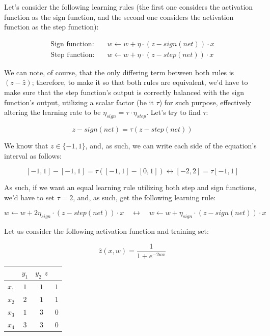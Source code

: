 \documentclass[12pt]{article}
\begin{document}
\begin{enumerate}[leftmargin=\labelsep]
\begin{enumerate}
{      Let's consider the following learning rules (the first one considers
      the activation function as the sign function, and the second one
      considers the activation function as the step function):

      \begin{align*}
        \text{Sign function:} \quad & w \leftarrow w + \eta \cdot (z - sign(net)) \cdot x \\
        \text{Step function:} \quad & w \leftarrow w + \eta \cdot (z - step(net)) \cdot x
      \end{align*}

      We can note, of course, that the only differing term between both rules
      is $(z - \hat{z})$; therefore, to make it so that both rules are
      equivalent, we'd have to make sure that the step function's output
      is correctly balanced with the sign function's output, utilizing a scalar
      factor (be it $\tau$) for such purpose, effectively altering the learning
      rate to be $\eta_{sign} = \tau \cdot \eta_{step}$. Let's try to find $\tau$:

      $$
      z - sign(net) = \tau (z - step(net))
      $$

      We know that $z \in \{-1, 1\}$, and, as such, we can write each side of
      the equation's interval as follows:

      $$
      [-1, 1] - [-1, 1] = \tau ([-1, 1] - [0, 1]) \leftrightarrow
      [-2, 2] = \tau [-1, 1]
      $$

      As such, if we want an equal learning rule utilizing both step and sign
      functions, we'd have to set $\tau = 2$, and, as such, get the following
      learning rule:

      $$
        w \leftarrow w + 2 \eta_{sign} \cdot (z - step(net)) \cdot x \quad \leftrightarrow \quad
        w \leftarrow w + \eta_{sign} \cdot (z - sign(net)) \cdot x
      $$
    }
  \end{enumerate}

  \begin{tcolorbox}[enhanced jigsaw,colback=bg,boxrule=0pt,arc=1pt,halign=center]
    \item Let us consider the following activation function and training set:

    \begin{equation*}
      \hat{z}(x, w) = \frac{1}{1 + e^{-2 w x}}
    \end{equation*}

    \begin{table}[H]
      \centering
      \begin{tabular}{c|c|c|c}
         & $y_1$ & $y_2$ $z$ \\ \hline
        $x_1$ & $1$ & $1$ & $1$ \\
        $x_2$ & $2$ & $1$ & $1$ \\
        $x_3$ & $1$ & $3$ & $0$ \\
        $x_4$ & $3$ & $3$ & $0$
      \end{tabular}
    \end{table}


\end{tcolorbox}
\end{enumerate}
\end{document}
